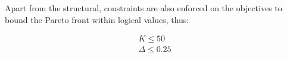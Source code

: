 Apart from the structural, constraints are also enforced on the objectives to bound the Pareto front within logical values, thus:

\begin{eqnarray}
   K \leq 50 \\
   \Delta \leq 0.25 
   \label{obj} 
\end{eqnarray}


\begin{figure}[h!]
\begin{minipage}[b]{0.5\linewidth}
 \centering
\end{minipage}
\begin{minipage}[b]{0.5\linewidth}
 \centering
\end{minipage}
\begin{minipage}[b]{0.5\linewidth}

\end{minipage}
\end{figure}
